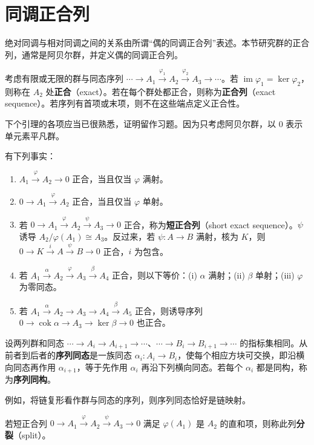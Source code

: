 \section{同调正合列}
绝对同调与相对同调之间的关系由所谓“偶的同调正合列”表述。本节研究群的正合列，通常是阿贝尔群，并定义偶的同调正合列。

考虑有限或无限的群与同态序列 $\cdots\to A_1\xrightarrow{\varphi_1}A_2\xrightarrow{\varphi_2}A_3\to\cdots$。若 $\operatorname{im}\varphi_1=\ker\varphi_2$，则称在 $A_2$ 处\textbf{正合}（exact）。若在每个群处都正合，则称为\textbf{正合列}（exact sequence）。若序列有首项或末项，则不在这些端点定义正合性。

下个引理的各项应当已很熟悉，证明留作习题。因为只考虑阿贝尔群，以 $0$ 表示单元素平凡群。

有下列事实：
\begin{enumerate}[label=(\arabic*)]
\item $A_1\xrightarrow{\varphi}A_2\to0$ 正合，当且仅当 $\varphi$ 满射。
\item $0\to A_1\xrightarrow{\varphi}A_2$ 正合，当且仅当 $\varphi$ 单射。
\item 若 $0\to A_1\xrightarrow{\varphi}A_2\xrightarrow{\psi}A_3\to0$ 正合，称为\textbf{短正合列}（short exact sequence）。$\psi$ 诱导 $A_2/\varphi(A_1)\cong A_3$。反过来，若 $\psi:A\to B$ 满射，核为 $K$，则 $0\to K\xrightarrow{i}A\xrightarrow{\psi}B\to0$ 正合，$i$ 为包含。
\item 若 $A_1\xrightarrow{\alpha}A_2\xrightarrow{\varphi}A_3\xrightarrow{\beta}A_4$ 正合，则以下等价：(i) $\alpha$ 满射；(ii) $\beta$ 单射；(iii) $\varphi$ 为零同态。
\item 若 $A_1\xrightarrow{\alpha}A_2\to A_3\to A_4\xrightarrow{\beta}A_5$ 正合，则诱导序列 $0\to\operatorname{cok}\alpha\to A_3\to\ker\beta\to0$ 也正合。
\end{enumerate}

设两列群和同态 $\cdots\to A_i\to A_{i+1}\to\cdots$、$\cdots\to B_i\to B_{i+1}\to\cdots$ 的指标集相同。从前者到后者的\textbf{序列同态}是一族同态 $\alpha_i:A_i\to B_i$，使每个相应方块可交换，即沿横向同态再作用 $\alpha_{i+1}$，等于先作用 $\alpha_i$ 再沿下列横向同态。若每个 $\alpha_i$ 都是同构，称为\textbf{序列同构}。

例如，将链复形看作群与同态的序列，则序列同态恰好是链映射。

若短正合列 $0\to A_1\xrightarrow{\varphi}A_2\xrightarrow{\psi}A_3\to0$ 满足 $\varphi(A_1)$ 是 $A_2$ 的直和项，则称此列\textbf{分裂}（split）。

